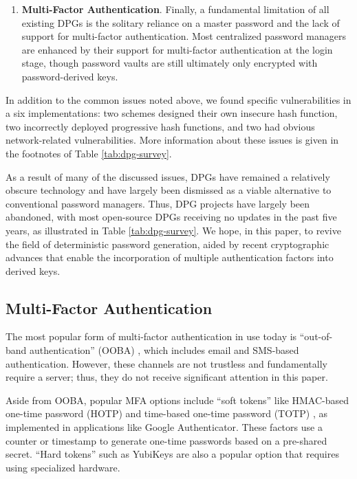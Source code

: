 \begin{enumerate}[leftmargin=*]
    \item \textbf{Multi-Factor Authentication}. Finally, a fundamental limitation of all existing DPGs is the solitary reliance on a master password and the lack of support for multi-factor authentication. Most centralized password managers are enhanced by their support for multi-factor authentication at the login stage, though password vaults are still ultimately only encrypted with password-derived keys.
\end{enumerate}

In addition to the common issues noted above, we found specific vulnerabilities in a six implementations: two schemes designed their own insecure hash function, two incorrectly deployed progressive hash functions, and two had obvious network-related vulnerabilities. More information about these issues is given in the footnotes of Table \ref{tab:dpg-survey}.

As a result of many of the discussed issues, DPGs have remained a relatively obscure technology and have largely been dismissed as a viable alternative to conventional password managers. Thus, DPG projects have largely been abandoned, with most open-source DPGs receiving no updates in the past five years, as illustrated in Table \ref{tab:dpg-survey}. We hope, in this paper, to revive the field of deterministic password generation, aided by recent cryptographic advances that enable the incorporation of multiple authentication factors into derived keys.

\subsection{Multi-Factor Authentication}

The most popular form of multi-factor authentication in use today is ``out-of-band authentication'' (OOBA) \cite{ooba}, which includes email and SMS-based authentication. However, these channels are not trustless and fundamentally require a server; thus, they do not receive significant attention in this paper.

Aside from OOBA, popular MFA options include ``soft tokens'' like HMAC-based one-time password (HOTP) \cite{rfc4226} and time-based one-time password (TOTP) \cite{rfc6238}, as implemented in applications like Google Authenticator. These factors use a counter or timestamp to generate one-time passwords based on a pre-shared secret.
``Hard tokens'' such as YubiKeys \cite{yubikey} are also a popular option that requires using specialized hardware.

